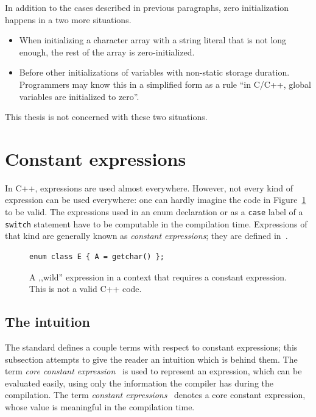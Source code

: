 \documentclass[nolot,nolof,nocover,printed]{fithesis3}
\newcommand{\stdN}[2]{\cite[#2]{#1}\xspace}
\begin{document}
In addition to the cases described in previous paragraphs, zero initialization happens in a two more situations.
\begin{itemize}
\item When initializing a character array with a string literal that is not long enough, the rest of the array is zero-initialized.
\item Before other initializations of variables with non-static storage duration. Programmers may know this in a simplified form as a rule \enquote{in C/C++, global variables are initialized to zero}.
\end{itemize}
This thesis is not concerned with these two situations.

\section{Constant expressions}
In C++, expressions are used almost everywhere. However, not every kind of expression can be used everywhere: one can hardly imagine the code in Figure~\ref{fig:getcharInEnum} to be valid. The expressions used in an enum declaration or as a \texttt{case} label of a \texttt{switch} statement have to be computable in the compilation time. Expressions of that kind are generally known as \textit{constant expressions}; they are defined in~\stdN{n4296}{\S 5.20}.

\begin{figure}
\begin{lstlisting}
enum class E { A = getchar() };
\end{lstlisting}
\caption{A ,,wild'' expression in a context that requires a constant expression. This is not a valid C++ code.}
\label{fig:getcharInEnum}
\end{figure}

\subsection{The intuition}

The standard defines a couple terms with respect to constant expressions; this subsection attempts to give the reader an intuition which is behind them. The term \textit{core constant expression}~\stdN{n4296}{\S 5.20.2} is used to represent an expression, which can be evaluated easily, using only the information the compiler has during the compilation. The term \textit{constant expressions}~\stdN{n4296}{\S 5.20/5} denotes a core constant expression, whose value is meaningful in the compilation time.
\end{document}
